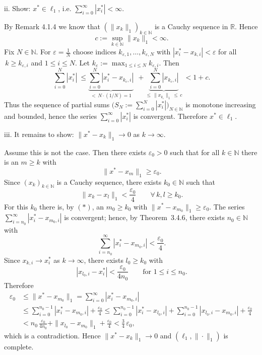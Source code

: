 \documentclass[12pt,a4paper]{article}
\newcommand{\N}{\mathbb{N}}
\newcommand{\R}{\mathbb{R}}
\newcommand{\eps}{\varepsilon}
\theoremstyle{plain}
\theoremstyle{definition}
\theoremstyle{remark}
\begin{document}
ii. Show: $x^{\ast}\in \ell_{1}$, i.e. $\sum_{i=0}^{\infty} |x_i^{\ast}| < \infty$.

By Remark 4.1.4 we know that $(\|x_k\|_{1})_{k\in\N}$ is a Cauchy sequence in $\R$. Hence
\[
	\ c := \sup_{k\in\N} \|x_k\|_{1} < \infty.
\]
Fix $N\in\N$. For $\eps=\tfrac{1}{N}$ choose indices $k_{\eps,1},\dots,k_{\eps,N}$ with $|x_i^{\ast}-x_{k,i}|<\eps$ for all $\,k\ge k_{\eps,i}$ and $1\le i\le N$. Let $k_{\eps}:=\max_{1\le i\le N} k_{\eps,i}$. Then
\[
	\ \sum_{i=0}^{N} |x_i^{\ast}|
		\ \le \underbrace{\sum_{i=0}^{N} |x_i^{\ast}-x_{k_{\eps},i}|}_{<\,N\cdot(1/N)=1}
		\ \ + \underbrace{\sum_{i=0}^{N} |x_{k_{\eps},i}|}_{\le\,\|x_{k_{\eps}}\|_{1}\,\le\,c}
		\ < 1 + c.
\]
Thus the sequence of partial sums $\big(S_N:=\sum_{i=0}^{N} |x_i^{\ast}|\big)_{N\in\N}$ is monotone increasing and bounded, hence the series $\sum_{i=0}^{\infty} |x_i^{\ast}|$ is convergent. Therefore $x^{\ast}\in\ell_{1}$.

iii. It remains to show: $\|x^{\ast} - x_{k}\|_{1} \to 0$ as $k\to\infty$.

Assume this is not the case. Then there exists $\varepsilon_{0} > 0$ such that for all $k \in \N$ there is an $m \ge k$ with
\[
	\ \|x^{\ast} - x_{m}\|_{1} \ge \varepsilon_{0}.\tag{$*$}
\]
Since $(x_{k})_{k\in\N}$ is a Cauchy sequence, there exists $k_{0} \in \N$ such that
\[
	\ \|x_{k} - x_{l}\|_{1} < \frac{\varepsilon_{0}}{4} \qquad \forall\, k,l \ge k_{0}.
\]
For this $k_{0}$ there is, by $(*)$, an $m_{0} \ge k_{0}$ with $\|x^{\ast} - x_{m_{0}}\|_{1} \ge \varepsilon_{0}$. The series $\sum_{i=n_{0}}^{\infty} |x^{\ast}_{i} - x_{m_{0},i}|$ is convergent; hence, by Theorem~3.4.6, there exists $n_{0} \in \N$ with
\[
	\ \sum_{i=n_{0}}^{\infty} |x^{\ast}_{i} - x_{m_{0},i}| < \frac{\varepsilon_{0}}{4}.
\]
Since $x_{k,i} \to x^{\ast}_{i}$ as $k \to \infty$, there exists $l_{0} \ge k_{0}$ with
\[
	\ |x_{l_{0},i} - x^{\ast}_{i}| < \frac{\varepsilon_{0}}{4 n_{0}} \qquad \text{for } 1 \le i \le n_{0}.
\]
Therefore
\[
\begin{aligned}
\varepsilon_{0}
&\le \|x^{\ast} - x_{m_{0}}\|_{1}
 = \sum_{i=0}^{\infty} |x^{\ast}_{i} - x_{m_{0},i}|
 \\&\le \sum_{i=0}^{n_{0}-1} |x^{\ast}_{i} - x_{m_{0},i}| + \frac{\varepsilon_{0}}{4}
 \le \sum_{i=0}^{n_{0}-1} |x^{\ast}_{i} - x_{l_{0},i}| + \sum_{i=0}^{n_{0}-1} |x_{l_{0},i} - x_{m_{0},i}| + \frac{\varepsilon_{0}}{4} \\
&< n_{0}\,\frac{\varepsilon_{0}}{4 n_{0}} + \|x_{l_{0}} - x_{m_{0}}\|_{1} + \frac{\varepsilon_{0}}{4}
 < \frac{3}{4}\,\varepsilon_{0},
\end{aligned}
\]
which is a contradiction. Hence $\|x^{\ast}-x_k\|_{1}\to 0$ and $(\ell_1,\|\cdot\|_1)$ is complete.
\end{document}

